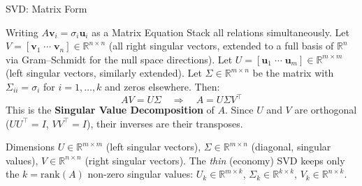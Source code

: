 \documentclass{beamer}
\begin{document}
\begin{frame}[shrink=10]{SVD: Matrix Form}
  \begin{block}{Writing $A\mathbf{v}_i = \sigma_i\mathbf{u}_i$ as a Matrix Equation}
    Stack all relations simultaneously.
    Let $V = [\mathbf{v}_1\;\cdots\;\mathbf{v}_n] \in \mathbb{R}^{n\times n}$
    (all right singular vectors, extended to a full basis of $\mathbb{R}^n$
    via Gram--Schmidt for the null space directions).
    Let $U = [\mathbf{u}_1\;\cdots\;\mathbf{u}_m] \in \mathbb{R}^{m\times m}$
    (left singular vectors, similarly extended).
    Let $\Sigma \in \mathbb{R}^{m\times n}$ be the matrix with
    $\Sigma_{ii} = \sigma_i$ for $i=1,\ldots,k$ and zeros elsewhere.
    Then:
    \[
      AV = U\Sigma
      \quad\Rightarrow\quad
      \boxed{A = U\Sigma V^\top}
    \]
    This is the \textbf{Singular Value Decomposition} of $A$.
    Since $U$ and $V$ are orthogonal ($UU^\top = I$, $VV^\top = I$),
    their inverses are their transposes.
  \end{block}

  \begin{block}{Dimensions}
    $U \in \mathbb{R}^{m\times m}$ (left singular vectors),\;
    $\Sigma \in \mathbb{R}^{m\times n}$ (diagonal, singular values),\;
    $V \in \mathbb{R}^{n\times n}$ (right singular vectors).
    The \emph{thin} (economy) SVD keeps only the $k = \mathrm{rank}(A)$
    non-zero singular values:
    $U_k \in \mathbb{R}^{m\times k}$,\;
    $\Sigma_k \in \mathbb{R}^{k\times k}$,\;
    $V_k \in \mathbb{R}^{n\times k}$.
  \end{block}
\end{frame}
\end{document}
